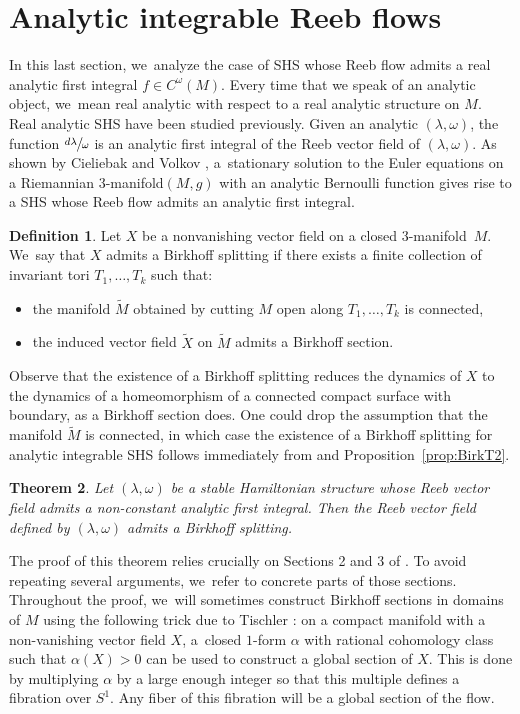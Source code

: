 \documentclass[10pt]{amsart}
\newcommand{\threemanifold}{$3$\nobreakdash-mani\-fold\xspace}
\newtheorem{theorem}{Theorem}[section]
\theoremstyle{definition}
\newtheorem{defi}[theorem]{Definition}
\begin{document}
\section{Analytic integrable Reeb flows}\label{sec:analytic}

In this last section, we~analyze the case of SHS whose Reeb flow admits a real analytic first integral $f\in C^\omega (M)$. Every time that we speak of an analytic object, we~mean real analytic with respect to a real analytic structure on $M$. Real analytic SHS have been studied previously. Given an analytic $(\lambda,\omega)$, the function $\sfrac{d\lambda}{\omega}$ is an analytic first integral of the Reeb vector field of $(\lambda,\omega)$. As shown by
Cieliebak and Volkov \cite{CV2}, a~stationary solution to the Euler equations on a Riemannian \threemanifold $(M,g)$ with an analytic Bernoulli function gives rise to a SHS whose Reeb flow admits an analytic first integral.

\begin{defi}\label{def:Bsplit}
Let $X$ be a nonvanishing vector field on a closed \threemanifold~$M$. We~say that $X$ admits a Birkhoff splitting if there exists a finite collection of invariant tori $T_1,\dots,T_k$ such that:
\begin{itemize}
\item
the manifold $\widetilde M$ obtained by cutting $M$ open along $T_1,\dots,T_k$ is connected,
\item
the induced vector field $\widetilde X$ on $\widetilde M$ admits a Birkhoff section.
\end{itemize}
\end{defi}
Observe that the existence of a Birkhoff splitting reduces the dynamics of $X$ to the dynamics of a homeomorphism of a connected compact surface with boundary, as a Birkhoff section does. One could drop the assumption that the manifold $\widetilde M$ is connected, in which case the existence of a Birkhoff splitting for analytic integrable SHS follows immediately from \cite{CV2} and Proposition~\ref{prop:BirkT2}.

\begin{theorem}\label{thm:split}
Let $(\lambda,\omega)$ be a stable Hamiltonian structure whose Reeb vector field admits a non-constant analytic first integral. Then the Reeb vector field defined by $(\lambda,\omega)$ admits a Birkhoff splitting.
\end{theorem}

The proof of this theorem relies crucially on Sections 2 and 3 of \cite{CV2}. To avoid repeating several arguments, we~refer to concrete parts of those sections. Throughout the proof, we~will sometimes construct Birkhoff sections in domains of $M$ using the following trick due to Tischler \cite{Tis}: on a compact manifold with a non-vanishing vector field $X$, a~closed $1$-form $\alpha$ with rational cohomology class such that $\alpha(X)>0$ can be used to construct a global section of $X$. This is done by multiplying $\alpha$ by a large enough integer so that this multiple defines a fibration over $S^1$. Any fiber of this fibration will be a global section of the flow.
\end{document}
